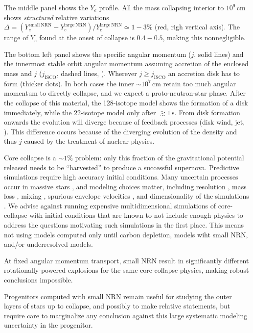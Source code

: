 \documentclass[twocolumn]{aastex63}
\begin{document}
The middle panel shows the $Y_e$ profile. All the mass collapsing
interior to $10^9\,\mathrm{cm}$ shows \emph{structured} relative
variations
$\Delta=(Y_e^\mathrm{small\ NRN}-Y_e^\mathrm{large\
  NRN})/Y_e^\mathrm{large\ NRN}\simeq 1-3\%$ (red, righ vertical
axis). The range of $Y_e$ found at the onset of collapse is $0.4-0.5$,
making this nonnegligible.

The bottom left panel shows the specific angular momentum ($j$, solid
lines) and the innermost stable orbit angular momentum assuming
accretion of the enclosed mass and $j$ ($j_\mathrm{ISCO}$, dashed
lines, \citealt{bardeen:72}). Wherever $j\geq j_\mathrm{ISCO}$ an
accretion disk has to form (thicker dots). In both cases the inner
$\sim{}10^{7}\,\mathrm{cm}$ retain too much angular momentum to
directly collapse, and we expect a proto-neutron-star phase. After the
collapse of this material, the 128-isotope model shows the formation
of a disk immediately, while the 22-isotope model only after
$\gtrsim 1\,\mathrm{s}$. From disk formation onwards the evolution
will diverge because of feedback processes (disk wind, jet,
\citealt{gottlieb:22}). This difference occurs because of the
diverging evolution of the density and thus $j$ caused by the
treatment of nuclear physics.

Core collapse is a $\sim{}1\%$ problem: only this fraction of the
gravitational potential released
needs to be ``harvested''
to produce a successful supernova. Predictive
simulations require high accuracy initial conditions. Many uncertain
processes occur in massive stars \citep[e.g.,][]{woosley:02,
  langer:12}, and modeling choices matter, including resolution
\citep{farmer:16}, mass loss \citep{renzo:17}, mixing
\citep{davis:19}, spurious envelope velocities
\citep[e.g.,][]{farmer:16, aguilera-dena:18}, and dimensionality of
the simulations \citep[e.g.,][]{fields:22}. We advise against running
expensive multidimensional simulations of core-collapse with initial
conditions that are known to not include enough physics to address the
questions motivating such simulations in the first place. This means
not using models computed only until carbon depletion, models wiht
small NRN, and/or underresolved
models.

At fixed angular momentum transport, small NRN result in significantly
different rotationally-powered explosions for the same core-collapse
physics, making robust conclusions impossible.

Progenitors computed with small NRN remain useful for studying the
outer layers of stars up to collapse, and possibly to make relative
statements, but require care to marginalize any conclusion against
this large systematic modeling uncertainty in the progenitor.


\end{document}
